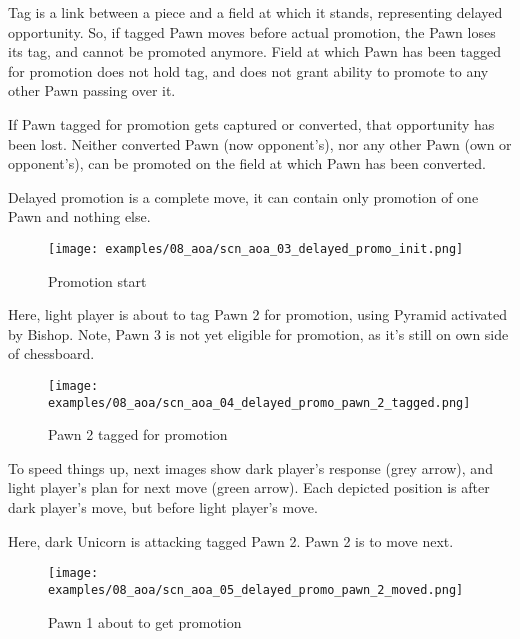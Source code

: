 Tag is a link between a piece and a field at which it stands, representing
delayed opportunity. So, if tagged Pawn moves before actual promotion, the
Pawn loses its tag, and cannot be promoted anymore. Field at which Pawn has
been tagged for promotion does not hold tag, and does not grant ability to
promote to any other Pawn passing over it.

If Pawn tagged for promotion gets captured or converted, that opportunity
has been lost. Neither converted Pawn (now opponent's), nor any other Pawn
(own or opponent's), can be promoted on the field at which Pawn has been
converted.

Delayed promotion is a complete move, it can contain only promotion of one
Pawn and nothing else.

\clearpage %

\noindent
\begin{figure}[h]
\texttt{[image: examples/08\_aoa/scn\_aoa\_03\_delayed\_promo\_init.png]}
\caption{Promotion start}
\label{fig:scn_aoa_03_delayed_promo_init}
\end{figure}

Here, light player is about to tag Pawn 2 for promotion, using Pyramid
activated by Bishop. Note, Pawn 3 is not yet eligible for promotion, as it's
still on own side of chessboard.

\clearpage %

\noindent
\begin{figure}[h]
\texttt{[image: examples/08\_aoa/scn\_aoa\_04\_delayed\_promo\_pawn\_2\_tagged.png]}
\caption{Pawn 2 tagged for promotion}
\label{fig:scn_aoa_04_delayed_promo_pawn_2_tagged}
\end{figure}

To speed things up, next images show dark player's response (grey arrow),
and light player's plan for next move (green arrow). Each depicted position
is after dark player's move, but before light player's move.

Here, dark Unicorn is attacking tagged Pawn 2. Pawn 2 is to move next.

\clearpage %

\noindent
\begin{figure}[h]
\texttt{[image: examples/08\_aoa/scn\_aoa\_05\_delayed\_promo\_pawn\_2\_moved.png]}
\caption{Pawn 1 about to get promotion}
\label{fig:scn_aoa_05_delayed_promo_pawn_2_moved}
\end{figure}

